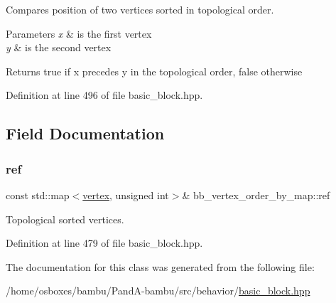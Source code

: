 Compares position of two vertices sorted in topological order. 


\begin{DoxyParams}{Parameters}
{\em x} & is the first vertex \\
\hline
{\em y} & is the second vertex \\
\hline
\end{DoxyParams}
\begin{DoxyReturn}{Returns}
true if x precedes y in the topological order, false otherwise 
\end{DoxyReturn}


Definition at line 496 of file basic\+\_\+block.\+hpp.



\subsection{Field Documentation}
\mbox{\label{classbb__vertex__order__by__map_ab98cf3dde2ae8273492cf4ca9a37b13f}} 
\subsubsection{\texorpdfstring{ref}{ref}}
{\footnotesize\ttfamily const std\+::map$<$\hyperlink{graph_8hpp_abefdcf0544e601805af44eca032cca14}{vertex}, unsigned int$>$\& bb\+\_\+vertex\+\_\+order\+\_\+by\+\_\+map\+::ref\hspace{0.3cm}{\ttfamily [private]}}



Topological sorted vertices. 



Definition at line 479 of file basic\+\_\+block.\+hpp.



The documentation for this class was generated from the following file\+:\begin{DoxyCompactItemize}
\item 
/home/osboxes/bambu/\+Pand\+A-\/bambu/src/behavior/\hyperlink{basic__block_8hpp}{basic\+\_\+block.\+hpp}\end{DoxyCompactItemize}
